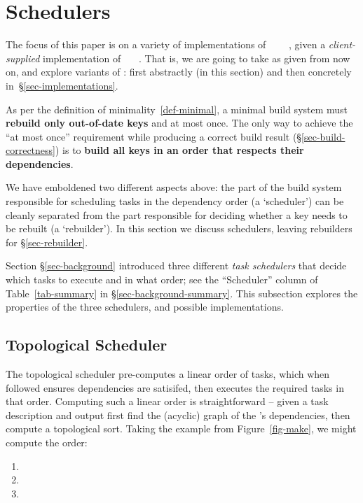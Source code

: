 \section{Schedulers}\label{sec-scheduler}

The focus of this paper is on a variety of implementations of
~~~~, given
a \emph{client-supplied} implementation of ~~~. That
is, we are going to take  as given from now on, and explore variants of
: first abstractly (in this section) and then concretely
in~\S\ref{sec-implementations}.

As per the definition of minimality~\ref{def-minimal}, a minimal build
system must \textbf{rebuild only out-of-date keys} and at most once. The only
way to achieve the ``at most once'' requirement while producing a correct build
result (\S\ref{sec-build-correctness}) is to \textbf{build all keys in an
order that respects their dependencies}.

We have emboldened two different aspects above: the part of the
build system responsible for scheduling tasks in the dependency order
(a `scheduler') can be cleanly separated from the part responsible for deciding
whether a key needs to be rebuilt (a `rebuilder'). In this section we discuss schedulers,
leaving rebuilders for \S\ref{sec-rebuilder}.

Section \S\ref{sec-background} introduced three different \emph{task schedulers}
that decide which tasks to execute and in what order; see the ``Scheduler'' column
of Table~\ref{tab-summary} in \S\ref{sec-background-summary}.
This subsection explores the properties of the three schedulers, and
possible implementations.

\subsection{Topological Scheduler}\label{sec-topological}

The topological scheduler pre-computes a linear order of tasks, which when followed ensures
dependencies are satisifed, then executes the required tasks in that order. Computing such a linear
order is straightforward -- given a task description and output  first find the (acyclic)
graph of the 's dependencies, then compute a topological sort. Taking the example from
Figure~\ref{fig-make}, we might compute the order:

\begin{enumerate}
\item {}
\item {}
\item {}
\end{enumerate}

